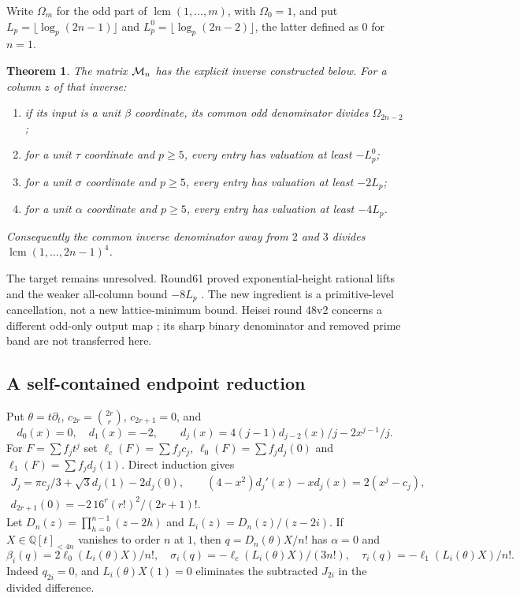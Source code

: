 \documentclass[11pt,a4paper]{article}
\numberwithin{equation}{section}
\newtheorem{theorem}{Theorem}[section]
\theoremstyle{definition}\newtheorem{definition}[theorem]{Definition}
\theoremstyle{remark}\newtheorem{remark}[theorem]{Remark}
\newcommand{\Q}{\mathbb Q}\newcommand{\Z}{\mathbb Z}\newcommand{\R}{\mathbb R}
\newcommand{\lc}{\ell_c}\newcommand{\ld}{\ell_0}\newcommand{\leone}{\ell_1}
\begin{document}
Write $\Omega_m$ for the odd part of $\operatorname{lcm}(1,\ldots,m)$, with $\Omega_0=1$, and put $L_p=\lfloor\log_p(2n-1)\rfloor$ and $L_p^0=\lfloor\log_p(2n-2)\rfloor$, the latter defined as $0$ for $n=1$.

\begin{theorem}\label{inverse:main}
The matrix $\mathcal M_n$ has the explicit inverse constructed below. For a column $z$ of that inverse:
\begin{enumerate}
\item if its input is a unit $\beta$ coordinate, its common odd denominator divides $\Omega_{2n-2}$;
\item for a unit $\tau$ coordinate and $p\ge5$, every entry has valuation at least $-L_p^0$;
\item for a unit $\sigma$ coordinate and $p\ge5$, every entry has valuation at least $-2L_p$;
\item for a unit $\alpha$ coordinate and $p\ge5$, every entry has valuation at least $-4L_p$.
\end{enumerate}
Consequently the common inverse denominator away from $2$ and $3$ divides $\operatorname{lcm}(1,\ldots,2n-1)^4$.
\end{theorem}
The target remains unresolved. Round61 proved exponential-height rational lifts and the weaker all-column bound $-8L_p$ \cite{M61}. The new ingredient is a primitive-level cancellation, not a new lattice-minimum bound. Heisei round 48v2 concerns a different odd-only output map \cite{H48}; its sharp binary denominator and removed prime band are not transferred here.

\subsection{A self-contained endpoint reduction}
Put $\theta=t\partial_t$, $c_{2r}=\binom{2r}r$, $c_{2r+1}=0$, and
\[
 d_0(x)=0,\quad d_1(x)=-2,\qquad
 d_j(x)=4(j-1)d_{j-2}(x)/j-2x^{j-1}/j.
\]
For $F=\sum f_jt^j$ set $\lc(F)=\sum f_jc_j$, $\ld(F)=\sum f_jd_j(0)$ and $\leone(F)=\sum f_jd_j(1)$.
Direct induction gives
\begin{gather}
 J_j=\pi c_j/3+\sqrt3d_j(1)-2d_j(0),\qquad
 (4-x^2)d_j'(x)-xd_j(x)=2(x^j-c_j),\label{inverse:differential}\\
 d_{2r+1}(0)=-2\,16^r(r!)^2/(2r+1)!.
\end{gather}
Let $D_n(z)=\prod_{h=0}^{n-1}(z-2h)$ and $L_i(z)=D_n(z)/(z-2i)$. If $X\in\Q[t]_{<4n}$ vanishes to order $n$ at $1$, then $q=D_n(\theta)X/n!$ has $\alpha=0$ and
\begin{equation}\label{inverse:coordinates}
 \beta_i(q)=2\ld(L_i(\theta)X)/n!,\quad
 \sigma_i(q)=-\lc(L_i(\theta)X)/(3n!),\quad
 \tau_i(q)=-\leone(L_i(\theta)X)/n!.
\end{equation}
Indeed $q_{2i}=0$, and $L_i(\theta)X(1)=0$ eliminates the subtracted $J_{2i}$ in the divided difference.
\end{document}
